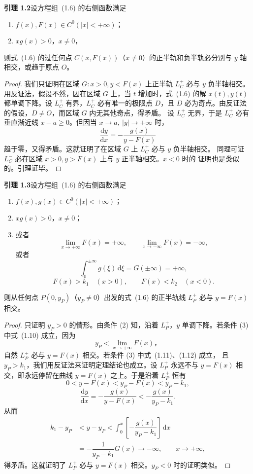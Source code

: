 \noindent\textbf{引理 1.2}\quad 设方程组~(1.6) 的右侧函数满足
\begin{enumerate}
  \item $f(x),F(x)\in C^0(|x|<+\infty)$；
  \item $xg(x)>0$，$x\ne0$，
\end{enumerate}
则式~(1.6) 的过任何点 $C(x,F(x))$（$x\ne0$）的正半轨和负半轨必分别与
$y$ 轴相交，或趋于原点 $O$。

\begin{proof}
我们只证明在区域 $G:x>0,y<F(x)$ 上正半轨 $L_C^+$ 必与 $y$ 负半轴相交。
用反证法，假设不然，因在区域 $G$ 上，当 $t$ 增加时，式~(1.6) 的解
$x(t),y(t)$ 都单调下降。设 $L_C^+$ 有界，$L_C^+$ 必有唯一的极限点 $D$，且
$D$ 必为奇点。由反证法的假设，$D\ne O$，而区域 $G$ 内无其他奇点，得矛盾。
设 $L_C^+$ 无界，于是 $L_C^+$ 必有垂直渐近线 $x-a\geq0$。但因当
$x\to a,\ |y|\to+\infty$ 时，
\[
  \dfrac{\mathrm{d}y}{\mathrm{d}x}=-\dfrac{g(x)}{y-F(x)}
\]
趋于零，又得矛盾。这就证明了在区域 $G$ 上 $L_C^+$ 必与 $y$ 负半轴相交。
同理可证 $L_C^-$ 必在区域 $x>0,y>F(x)$ 上与 $y$ 正半轴相交。$x<0$ 时的
证明也是类似的。引理证毕。
\end{proof}

\noindent\textbf{引理 1.3}\quad 设方程组~(1.6) 的右侧函数满足
\begin{enumerate}
  \item $f(x),g(x)\in C^0(|x|<+\infty)$；
  \item $xg(x)>0$，$x\ne0$；
  \item 或者
  \[
    \lim_{x\to+\infty}F(x)=+\infty,\qquad
    \lim_{x\to-\infty}F(x)=-\infty, \tag{1.10}
  \]
  或者
  \[
    \int_0^{\pm\infty}g(\xi)\,\mathrm{d}\xi
    =G(\pm\infty)=+\infty, \tag{1.11}
  \]
  \[
    F(x)>k_1\quad(x>0),\qquad F(x)<k_2\quad(x<0). \tag{1.12}
  \]
\end{enumerate}
则从任何点 $P(0,y_P)$（$y_P\ne0$）出发的式~(1.6) 的正半轨线 $L_P^+$
必与 $y=F(x)$ 相交。

\begin{proof}
只证明 $y_P>0$ 的情形。由条件 (2) 知，沿着 $L_P^+$，$y$ 单调下降。若条件
(3) 中式~(1.10) 成立，因为
\[
  y_P<\lim_{x\to+\infty}F(x)，
\]
自然 $L_P^+$ 必与 $y=F(x)$ 相交。若条件 (3) 中式~(1.11)、(1.12) 成立，
且 $y_P>k_1$，我们用反证法来证明定理结论也成立。设 $L_P^+$ 永远不与
$y=F(x)$ 相交，即永远停留在曲线 $y=F(x)$ 之上。于是沿着 $L_P^+$ 恒有
\[
  0<y-F(x)<y_P-F(x)<y_P-k_1,
\]
\[
  \dfrac{\mathrm{d}y}{\mathrm{d}x}
  =-\dfrac{g(x)}{y-F(x)}<-\dfrac{g(x)}{y_P-k_1}.
\]
从而
\[
\begin{aligned}
  k_1-y_P&<y-y_P
  <\int_0^x\left[-\dfrac{g(x)}{y_P-k_1}\right]\,\mathrm{d}x\\
  &=-\dfrac{1}{y_P-k_1}G(x)\longrightarrow-\infty,
  \qquad x\longrightarrow+\infty,
\end{aligned}
\]
得矛盾。这就证明了 $L_P^+$ 必与 $y=F(x)$ 相交。$y_P<0$ 时的证明类似。
\end{proof}

